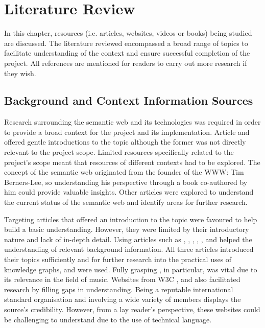\chapter{Literature Review}
In this chapter, resources (i.e. articles, websites, videos or books) being studied are discussed. The literature reviewed encompassed a broad range of topics to facilitate understanding of the context and ensure successful completion of the project. All references are mentioned for readers to carry out more research if they wish. 

\section{Background and Context Information Sources}
\hspace{0.5cm} Research surrounding the semantic web and its technologies was required in order to provide a broad context for the project and its implementation. Article \cite{semanticweb} and \cite{berners2001semantic} offered gentle introductions to the topic although the former was not directly relevant to the project scope. Limited resources specifically related to the project's scope meant that resources of different contexts had to be explored. The concept of the semantic web originated from the founder of the WWW: Tim Berners-Lee, so understanding his perspective through a book \cite{berners-TBLBook} co-authored by him could provide valuable insights. Other articles \cite{bizer2011linked} were explored to understand the current status of the semantic web and identify areas for further research. 

Targeting articles that offered an introduction to the topic were favoured to help build a basic understanding. However, they were limited by their introductory nature and lack of in-depth detail. Using articles such as \cite{ontology}, \cite{knowledgegraph}, \cite{sikos_2015}, \cite{gottschalk2021creation}, \cite{arasu_garcia-molina_university_2003}, \cite{studer_benjamins_fensel_1998} and \cite{rdf} helped the understanding of relevant background information. All three articles introduced their topics sufficiently and for further research into the practical uses of knowledge graphs, \cite{searchengine} and \cite{oramas2016sound} were used. Fully grasping \cite{oramas2016sound}, in particular, was vital due to its relevance in the field of music. Websites from W3C \cite{TTL}, \cite{w3crdf} and \cite{w3cvocabularies} also facilitated research by filling gaps in understanding. Being a reputable international standard organisation and involving a wide variety of members displays the source's credibility. However, from a lay reader's perspective, these websites could be challenging to understand due to the use of technical language.


